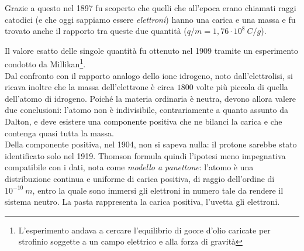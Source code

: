 \vspace{0.5 cm}

Grazie a questo nel 1897 fu scoperto che quelli che all'epoca erano chiamati raggi catodici (e che oggi sappiamo essere \emph{elettroni}) hanno una carica e una massa e fu trovato anche il rapporto tra queste due quantità ($q/m = 1,76 \cdot 10^8 \ C/g$).

Il valore esatto delle singole quantità fu ottenuto nel 1909 tramite un esperimento condotto da Millikan\footnote{L'esperimento andava a cercare l'equilibrio di gocce d'olio caricate per strofinio soggette a un campo elettrico e alla forza di gravità}.\\

Dal confronto con il rapporto analogo dello ione idrogeno, noto dall'elettrolisi, si ricava inoltre che la massa dell'elettrone è circa $1800$ volte più piccola di quella dell'atomo di idrogeno. Poiché la materia ordinaria è neutra, devono allora valere due conclusioni: l'atomo non è indivisibile, contrariamente a quanto assunto da Dalton, e deve esistere una componente positiva che ne bilanci la carica e che contenga quasi tutta la massa.\\

Della componente positiva, nel 1904, non si sapeva nulla: il protone sarebbe stato identificato solo nel 1919. 
Thomson formula quindi l'ipotesi meno impegnativa compatibile con i dati, nota come \emph{modello a panettone}: l'atomo è una distribuzione continua e uniforme di carica positiva, di raggio dell'ordine di $10^{-10} \ m$, entro la quale sono immersi gli elettroni in numero tale da rendere il sistema neutro. 
La pasta rappresenta la carica positiva, l'uvetta gli elettroni.\\




